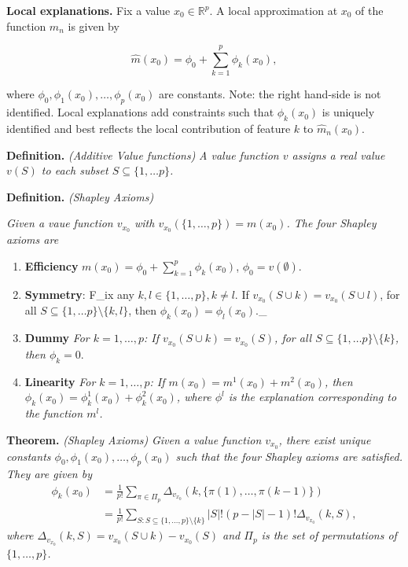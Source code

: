 \documentclass[a4paper,10pt,openany]{book}
\providecommand{\tightlist}{%
 \setlength{\itemsep}{0pt}\setlength{\parskip}{0pt}}
\begin{document}
\textbf{Local explanations.} Fix a value \(x_0 \in \mathbb R^p\). A local approximation at \(x_0\) of the function \(\hat m_n\) is given by

\[
\hat m\left(x_0\right)=\phi_{0}+\sum_{k=1}^{p} \phi_k(x_0),
\]

where \(\phi_0,\phi_1(x_0),\dots,\phi_p(x_0)\) are constants. Note: the right hand-side is not identified. Local explanations add constraints such that \(\phi_k(x_0)\) is uniquely identified and best reflects the local contribution of feature \(k\) to \(\hat m_n\left(x_0\right)\).

\textbf{Definition.} \emph{(Additive Value functions)} \emph{A value function \(v\) assigns a real value
\(v(S)\) to each subset \(S \subseteq \{1,\dots p\}\).}

\textbf{Definition.} \emph{(Shapley Axioms)}

\emph{Given a vaue function \(v_{x_0}\) with \(v_{x_0}(\{1,\dots,p\})=m(x_0)\). The four Shapley axioms are}

\begin{enumerate}
\def\labelenumi{\arabic{enumi}.}
\tightlist
\item
  \textbf{Efficiency} \(m\left(x_0\right)=\phi_{0}+\sum_{k=1}^{p} \phi_k(x_0)\), \(\phi_{0}=v(\emptyset)\).
\item
  \textbf{Symmetry}: F\_ix any \(k,l \in \{1,\dots,p\}, k\neq l\). If \(v_{x_0}(S\cup k)=v_{x_0}(S\cup l)\), for all \(S \subseteq \{1,\dots p\}\setminus \{k,l\}\), then \(\phi_k(x_0)=\phi_l(x_0).\)\_
\item
  \textbf{Dummy} \emph{For \(k=1,\dots,p\): If \(v_{x_0}(S\cup k)=v_{x_0}(S)\), for all \(S \subseteq \{1,\dots p\}\setminus \{k\}\), then \(\phi_k=0.\)}
\item
  \textbf{Linearity} \emph{For \(k=1,\dots,p\): If \(m(x_0)=m^1(x_0)+m^2(x_0)\), then \(\phi_k(x_0)=\phi^1_k(x_0)+\phi^2_k(x_0)\), where \(\phi^l\) is the explanation corresponding to the function \(m^l\).}
\end{enumerate}

\textbf{Theorem.} \emph{(Shapley Axioms)} \emph{Given a value function \(v_{x_0}\), there exist unique constants \(\phi_0,\phi_1(x_0),\dots,\phi_p(x_0)\) such that the four Shapley axioms are satisfied. They are given by}
\begin{align}
\phi_{k}(x_0)&=\frac{1}{p !} \sum_{\pi \in \Pi_p} \Delta_{v_{x_0}}\left(k, \{\pi(1),\dots,\pi(k-1)\}\right)\\
&=\frac 1 {p!}\sum_{S: S \subseteq \{1,\dots,p\} \setminus\{k\}} {|S| !(p -|S|-1) !}\Delta_{v_{x_0}}(k, S),
\end{align}
\emph{where \(\Delta_{v_{x_0}}(k, S)=v_{x_0}(S \cup k)-v_{x_0}(S)\) and \(\Pi_p\) is the set of permutations of \(\{1,\dots,p\}\).}
\end{document}

